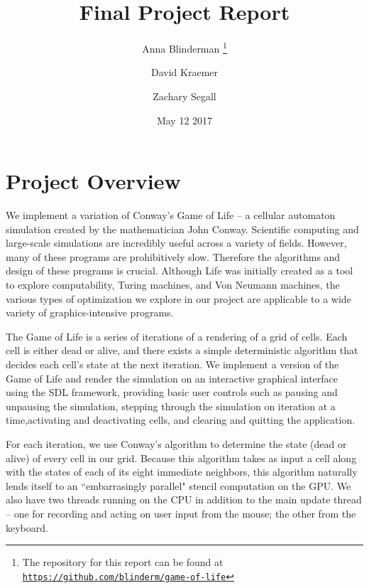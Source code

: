 \documentclass[onecolumn,12pt]{IEEEtran}
\title{Final Project Report}
\author{Anna Blinderman%
  \thanks{The repository for this report can be found at \href{https://github.com/blinderm/game-of-life} {\texttt{https://github.com/blinderm/game-of-life}}}}
\author{David Kraemer}
\author{Zachary Segall}
\affil{CSC 213: Operating Systems and Parallel Algorithms (Curtsinger)}
\date{May 12 2017}
\begin{document}
  \maketitle

  \section{Project Overview}

  We implement a variation of Conway's Game of Life -- a cellular automaton
  simulation created by the mathematician John Conway.  Scientific computing and
  large-scale simulations are incredibly useful across a variety of fields.
  However, many of these programs are prohibitively slow. Therefore the
  algorithms and design of these programs is crucial. Although Life was initially
  created as a tool to explore computability, Turing machines, and Von Neumann
  machines, the various types of optimization we explore in our project are
  applicable to a wide variety of graphics-intensive programs. 

  The Game of Life is a series of iterations of a rendering of a grid of
  cells. Each cell is either dead or alive, and there exists a simple
  deterministic algorithm that decides each cell's state at the next iteration.
  We implement a version of the Game of Life and render the simulation on an
  interactive graphical interface using the SDL framework, providing basic user
  controls such as pausing and unpausing the simulation, stepping through the 
  simulation on iteration at a time,activating and deactivating cells, and 
  clearing and quitting the application.

  For each iteration, we use Conway's algorithm to determine the state (dead or
  alive) of every cell in our grid. Because this algorithm takes as input a cell
  along with the states of each of its eight immediate neighbors, this algorithm
  naturally lends itself to an ``embarrasingly parallel" stencil computation on
  the GPU. We also have two threads running on the CPU in addition to the main
  update thread -- one for recording and acting on user input from the mouse; the
  other from the keyboard. 
\end{document}
